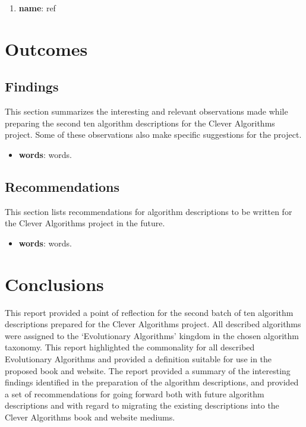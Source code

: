 \documentclass[a4paper, 11pt]{article}
\begin{document}
\begin{enumerate}
	\item \textbf{name}: ref
\end{enumerate}

% 
% 
\section{Outcomes}
\label{sec:outcomes}

% 
% 
\subsection{Findings}
This section summarizes the interesting and relevant observations made while preparing the second ten algorithm descriptions for the Clever Algorithms project. Some of these observations also make specific suggestions for the project. 

\begin{itemize}
	\item \textbf{words}: words.
\end{itemize}


% 
% 
\subsection{Recommendations}
This section lists recommendations for algorithm descriptions to be written for the Clever Algorithms project in the future. 

\begin{itemize}
	\item \textbf{words}: words.
\end{itemize}

% 
% 
\section{Conclusions}
\label{sec:conclusions}
This report provided a point of reflection for the second batch of ten algorithm descriptions prepared for the Clever Algorithms project. All described algorithms were assigned to the `Evolutionary Algorithms' kingdom in the chosen algorithm taxonomy. This report highlighted the commonality for all described Evolutionary Algorithms and provided a definition suitable for use in the proposed book and website.
The report provided a summary of the interesting findings identified in the preparation of the algorithm descriptions, and provided a set of recommendations for going forward both with future algorithm descriptions and with regard to migrating the existing descriptions into the Clever Algorithms book and website mediums.



\end{document}
